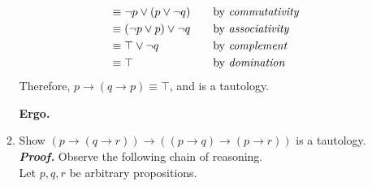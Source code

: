 \documentclass[11pt,a4paper]{article}
\begin{document}
\begin{enumerate}
\begin{enumerate}
\begin{align*}
            &\equiv \neg p \lor (p \lor \neg q)
                &\quad 
                &\text{by \emph{commutativity}} \\
            &\equiv (\neg p \lor p) \lor \neg q
                &\quad
                &\text{by \emph{associativity}} \\
            &\equiv \top \lor \neg q
                &\quad 
                &\text{by \emph{complement}} \\
            &\equiv \top
                &\quad 
                &\text{by \emph{domination}}
        \end{align*}
        Therefore, $p \rightarrow (q \rightarrow p) \equiv \top$, and is a tautology.
        \begin{flushright}
            \textbf{Ergo.}
        \end{flushright}
        \pagebreak
        \item 
        Show $(p \rightarrow (q \rightarrow r)) \rightarrow ((p \rightarrow q) \rightarrow (p \rightarrow r))$ is a tautology. \\
        \emph{\textbf{Proof.}} Observe the following chain of reasoning. \\ 
        Let $p, q, r$ be arbitrary propositions.
        

\end{enumerate}
\end{enumerate}
\end{document}
